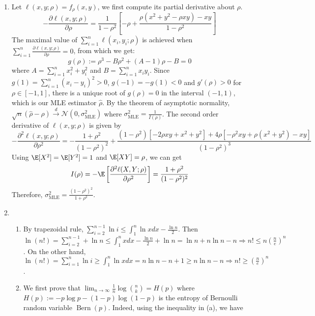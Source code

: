\documentclass{article}
\DeclareMathOperator{\Bern}{Bern}
\begin{document}
\begin{enumerate}
\item Let $\ell(x,y;\rho)=f_{\rho}(x,y)$, we first compute its partial derivative
about $\rho$.
\begin{equation*}
    -\frac{\partial \ell(x,y;\rho)}{\partial \rho}
    = \frac{1}{1-\rho^2}[-\rho + \frac{\rho(x^2+y^2-\rho xy)-xy}{1-\rho^2}]
\end{equation*}
The maximal value of $\sum_{i=1}^n \ell(x_i,y_i;\rho)$ is achieved when
$\sum_{i=1}^n \frac{\partial \ell(x,y;\rho)}{\partial \rho}=0$, from
which we get:
$$
g(\rho):=\rho^3 - B \rho^2 + (A-1)\rho - B=0
$$
where
$    A = \sum_{i=1}^{n} x_i^2+y_i^2$ and
$    B = \sum_{i=1}^n x_i y_i$.
Since $g(1) = \sum_{i=1}^n (x_i-y_i)^2 > 0$, $g(-1)=-g(1)<0$ and $g'(\rho)>0$
for $\rho\in [-1,1]$, there is a unique root of $g(\rho)=0$ in the interval
$(-1,1)$, which is our MLE estimator $\hat{\rho}$.
By the theorem of asymptotic normality, 
$\sqrt{n}(\hat{\rho} - \rho) \xrightarrow{d} \mathcal{N}(0, \sigma^2_{\mathrm{MLE}})$ where $\sigma^2_{\mathrm{MLE}}=\frac{1}{I(\rho)}$.
The second order derivative of $\ell(x,y;\rho)$ is given by
\begin{equation*}
    -\frac{\partial^2 \ell(x,y;\rho)}{\partial \rho^2}
    = - \frac{1+\rho^2}{(1-\rho^2)^2}
    + \frac{(1-\rho^2)[-2\rho xy+x^2+y^2]+4\rho[-\rho^2 xy + \rho (x^2+y^2)-xy]}{(1-\rho^2)^3}
\end{equation*}
Using $\E[X^2]=\E[Y^2]=1$ and $\E[XY]=\rho$, we can get
\begin{equation*}
    I(\rho)=-\E\left[\frac{\partial^2 \ell(X,Y;\rho)}{\partial \rho^2}\right]
    = \frac{1+\rho^2}{(1-\rho^2)^2}
\end{equation*}
Therefore, $\sigma^2_{\mathrm{MLE}} = \frac{(1-\rho^2)^2}{1+\rho^2}$.
    \item 
    \begin{enumerate}
        \item By trapezoidal rule, $\sum_{i=2}^{n-1} \ln i \leq \int_1^n \ln x dx - \frac{\ln n}{2}$.
        Then $\ln (n!) = \sum_{i=2}^{n-1} + \ln n \leq \int_{1}^n xdx - \frac{\ln n}{2}+\ln n  = \ln n + n \ln n - n \Rightarrow n! \leq n(\frac{n}{e})^n$.
        On the other hand, $\ln (n!) = \sum_{i=1}^n \ln i \geq \int_1^n \ln x dx = n \ln n - n +1 \geq n \ln n - n \Rightarrow n! \geq (\frac{n}{e})^n$.
        \item We first prove that $\lim_{n\to \infty} \frac{1}{n} \log \binom{n}{k} = H(p)$ where $H(p):=-p\log p-(1-p)\log(1-p)$ is the entropy of Bernoulli
        random variable $\Bern(p)$.
        Indeed, using the inequality in (a), we have

\end{enumerate}
\end{enumerate}
\end{document}
